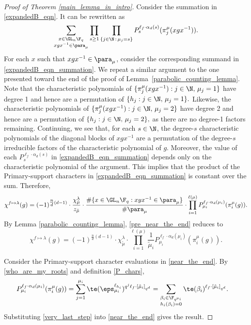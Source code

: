\begin{proof}[Proof of Theorem \ref{main_lemma_in_intro}]
Consider the summation in \eqref{expandedB_eqn}.
It can be rewritten as
\begin{equation}
\label{expandedB_eqn_summation}
\sum_{\substack{x \in \GL_n \F_q \\ xgx^{-1} \in \para_\mu}}
\prod_{s \geq 1}
\prod_{\{j \in \N \, : \, \mu_j = s\}}
P_s^{\ell_f \cdot \alpha_d(s)}
(\pi_j^\mu (xgx^{-1})).
\end{equation}
For each $x$ such that $xgx^{-1} \in \para_\mu$, consider the corresponding summand in \eqref{expandedB_eqn_summation}.
We repeat a similar argument to the one presented toward the end of the proof of Lemma~\ref{parabolic_counting_lemma}.
Note that the characteristic polynomials of
\(
\{\pi_{j}^\mu (xgx^{-1})
: j \in \N, \, \mu_j = 1\}\)
have degree 1 and hence are a permutation of
\(
\{h_j : j \in \N, \, \mu_j = 1\}.
\)
Likewise, the characteristic polynomials of
\(
\{\pi_{j}^\mu (xgx^{-1}) : j \in \N, \, \mu_j = 2\}\)
have degree 2 and hence are a permutation of
\(
\{h_j : j \in \N, \, \mu_j = 2\},
\)
as there are no degree-1 factors remaining.
Continuing, we see that, for each \(s \in \N\), the degree-\(s\) characteristic polynomials of the diagonal blocks of \(xgx^{-1}\) are a permutation of the degree-\(s\) irreducible factors of the characteristic polynomial of \(g\).
Moreover, the value of each \(P_s^{\ell_f \cdot \alpha_d(s)}\) in \eqref{expandedB_eqn_summation} depends only on the characteristic polynomial of the argument.
This implies that the product of the Primary-support characters in \eqref{expandedB_eqn_summation} is constant over the sum.
Therefore,
\begin{equation}
\label{pre_near_the_end}
\chi^{f \mapsto \lambda} (g) = (-1)^{\tfrac{n}{d} (d-1)} \cdot \frac{\chi^\lambda_{\tilde{\mu}}}{z_{\tilde{\mu}}} \cdot \frac{\# \{x \in \GL_n \F_q : xyx^{-1} \in \para_\mu \} }{\# \para_{\mu}} \cdot \prod_{i = 1}^{\ell(\mu)} P_{\mu_i}^{\ell_f \cdot \alpha_d (\mu_i)} (\pi^\mu_i (g)).
\end{equation}
By Lemma \ref{parabolic_counting_lemma}, \eqref{pre_near_the_end} reduces to
\begin{equation}
\label{near_the_end}
\chi^{f \mapsto \lambda} (g) = (-1)^{\tfrac{n}{d}(d-1)} \cdot
\chi^\lambda_{\tilde{\mu}}
\cdot
\prod_{i = 1}^{\ell(\mu)}
\frac{1}{\tilde{\mu}_i}
P_{\mu_i}^{\ell_f \cdot \alpha_d (\mu_i)} (\pi^\mu_i(g)).
\end{equation}

Consider the Primary-support character evaluations in \eqref{near_the_end}.
By \eqref{who_are_my_roots} and definition \eqref{P_chars},
\begin{align}
P_{\mu_i}^{\ell_f \cdot \alpha_d (\mu_i)} (\pi^\mu_i (g))
& = \sum_{j = 1}^{\mu_i} \te(\eps_{\mu_i}^{\ell_{h_i}})^{q^j \ell_f \cdot [\tilde{\mu}_i]_{q^d}}
= \sum_{\substack{\beta_i \in \F_{q^{\mu_i}} \\ h_i( \beta_i) = 0}} \te ( \beta_i )^{\ell_f \cdot [\tilde{\mu}_i]_{q^d}}. \label{very_last_step}
\end{align}
Substituting \eqref{very_last_step} into \eqref{near_the_end}
gives the result.
\end{proof}

